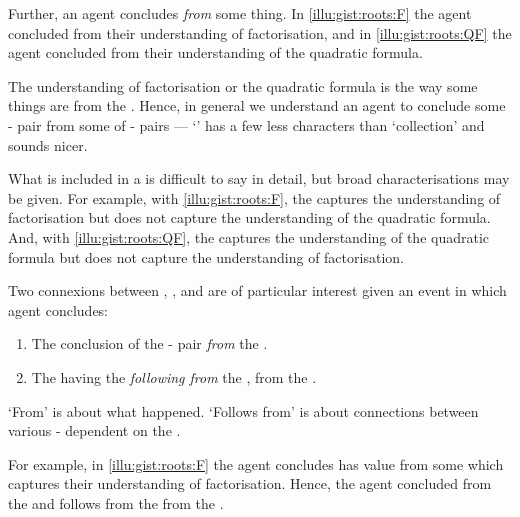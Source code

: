 \begin{note}
  Further, an agent concludes \emph{from} some thing.
  In \autoref{illu:gist:roots:F} the agent concluded from their understanding of factorisation, and in \autoref{illu:gist:roots:QF} the agent concluded from their understanding of the quadratic formula.

  The \agents{} understanding of factorisation or the quadratic formula is the way some things are from the \agpe{}.
  Hence, in general we understand an agent to conclude some - pair from some \emph{\pool{}} of \prop{}-\val{} pairs --- `\pool{}' has a few less characters than `collection' and sounds nicer.

  What is included in a \pool{} is difficult to say in detail, but broad characterisations may be given.
  For example, with \autoref{illu:gist:roots:F}, the \pool{} captures the \agents{} understanding of factorisation but does not capture the \agents{} understanding of the quadratic formula.
  And, with \autoref{illu:gist:roots:QF}, the \pool{} captures the \agents{} understanding of the quadratic formula but does not capture the \agents{} understanding of factorisation.
\end{note}


\begin{note}
  Two connexions between , , and  are of particular interest given an event in which agent concludes:
  \begin{enumerate}
  \item
    The \agents{} conclusion of the - pair \emph{from} the .
  \item
    The  having the  \emph{following from} the , from the \agpe{}.
  \end{enumerate}
  `From' is about what happened.
  `Follows from' is about connections between various - dependent on the \agpe{}.

  For example, in \autoref{illu:gist:roots:F} the agent concludes \propM{\rootsCon{}} has value  from some \pool{} which captures their understanding of factorisation.
  Hence, the agent concluded  from the \pool{} and  follows from the \pool{} from the \agpe{}.
\end{note}


